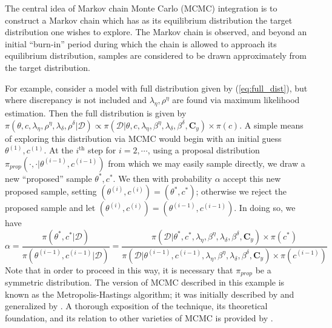 \documentclass{article}
\begin{document}
The central idea of Markov chain Monte Carlo (MCMC) integration is to construct a Markov chain which has as its equilibrium distribution the target distribution one wishes to explore. The Markov chain is observed, and beyond an initial ``burn-in'' period during which the chain is allowed to approach its equilibrium distribution, samples are considered to be drawn approximately from the target distribution.

For example, consider a model with full distribution given by (\ref{eq:full_dist}), but where discrepancy is not included and $\lambda_\eta,\rho^\eta$ are found via maximum likelihood estimation. Then the full distribution is given by $\pi(\theta,c,\lambda_\eta,\rho^\eta,\lambda_\delta,\rho^\delta|\mathcal D)
\propto \pi(\mathcal D | \theta,c,\lambda_\eta, \beta^\eta,\lambda_\delta,\beta^\delta,\mathbf C_y) \times \pi(c)$. A simple means of exploring this distribution via MCMC would begin with an initial guess $\theta^{(1)},c^{(1)}$. At the $i^{\text{th} }$ step for $i=2,\cdots$, using a proposal distribution $\pi_{prop}(\cdot,\cdot|{\theta^{(i-1)},c^{(i-1)}})$ from which we may easily sample directly, we draw a new ``proposed'' sample $\theta^*,c^*$. We then with probability $\alpha$ accept this new proposed sample, setting $(\theta^{(i)},c^{(i)}) = (\theta^*,c^*)$; otherwise we reject the proposed sample and let $(\theta^{(i)},c^{(i)}) = (\theta^{(i-1)},c^{(i-1)})$. In doing so, we have 
\begin{equation}\label{eq:mh-acceptance}
\alpha = \frac{\pi(\theta^*,c^* | \mathcal D)}{ \pi(\theta^{(i-1)},c^{(i-1)}|\mathcal D) } = 
\frac{ \pi(\mathcal D | \theta^*,c^*,\lambda_\eta, \beta^\eta,\lambda_\delta,\beta^\delta,\mathbf C_y) \times \pi(c^*)}{\pi(\mathcal D | \theta^{(i-1)},c^{(i-1)},\lambda_\eta, \beta^\eta,\lambda_\delta,\beta^\delta,\mathbf C_y) \times \pi(c^{(i-1)})}
\end{equation}
Note that in order to proceed in this way, it is necessary that $\pi_{prop}$ be a symmetric distribution. The version of MCMC described in this example is known as the Metropolis-Hastings algorithm; it was initially described by \cite{Metropolis1953} and generalized by \cite{Hastings1970}. A thorough exposition of the technique, its theoretical foundation, and its relation to other  varieties of MCMC is provided by \cite{Chib1995}.
\end{document}
